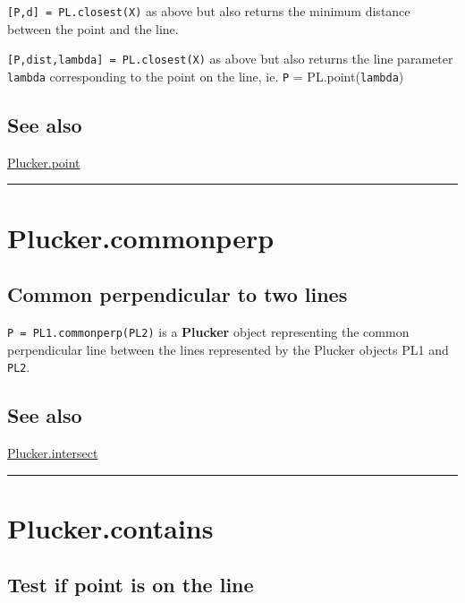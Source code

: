 \texttt{[P,d] = PL.closest(X)} as above but also returns the minimum distance
between the point and the line.



\texttt{[P,dist,lambda] = PL.closest(X)} as above but also returns the line parameter
\texttt{lambda} corresponding to the point on the line, ie. \texttt{P} = PL.point(\texttt{lambda})


\subsection*{See also}


\hyperlink{Plucker.point}{\color{blue} Plucker.point}

\vspace{1.5ex}\hrule

\hypertarget{Plucker.commonperp}{\section*{Plucker.commonperp}}
\subsection*{Common perpendicular to two lines}


\texttt{P = PL1.commonperp(PL2)} is a \textbf{\color{red} Plucker} object representing the common
perpendicular line between the lines represented by the Plucker objects
PL1 and \texttt{PL2}.


\subsection*{See also}


\hyperlink{Plucker.intersect}{\color{blue} Plucker.intersect}

\vspace{1.5ex}\hrule

\hypertarget{Plucker.contains}{\section*{Plucker.contains}}
\subsection*{Test if point is on the line}


